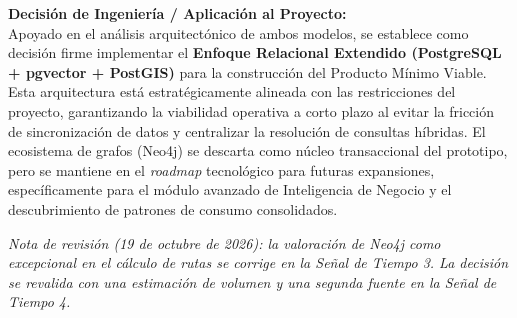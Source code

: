 \textbf{Decisión de Ingeniería / Aplicación al Proyecto:} \\
Apoyado en el análisis arquitectónico de ambos modelos, se establece como decisión firme implementar el \textbf{Enfoque Relacional Extendido (PostgreSQL + pgvector + PostGIS)} para la construcción del Producto Mínimo Viable. Esta arquitectura está estratégicamente alineada con las restricciones del proyecto, garantizando la viabilidad operativa a corto plazo al evitar la fricción de sincronización de datos y centralizar la resolución de consultas híbridas. El ecosistema de grafos (Neo4j) se descarta como núcleo transaccional del prototipo, pero se mantiene en el \textit{roadmap} tecnológico para futuras expansiones, específicamente para el módulo avanzado de Inteligencia de Negocio y el descubrimiento de patrones de consumo consolidados.

\textit{Nota de revisión (19 de octubre de 2026): la valoración de Neo4j como excepcional en el cálculo de rutas se corrige en la Señal de Tiempo 3. La decisión se revalida con una estimación de volumen y una segunda fuente en la Señal de Tiempo 4.}

\vspace{0.5cm}
